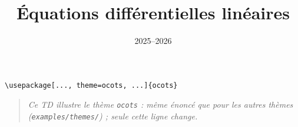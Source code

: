 \documentclass[11pt]{ocots-td}
\title{Équations différentielles linéaires}
\date{2025--2026}
\begin{document}
\maketitle

\begin{lstlisting}
\usepackage[..., theme=ocots, ...]{ocots}
\end{lstlisting}
\begin{quote}\itshape
Ce TD illustre le th\`eme \texttt{ocots} : m\^eme \'enonc\'e que pour les
autres th\`emes (\texttt{examples/themes/}) ; seule cette ligne change.
\end{quote}


\end{document}
